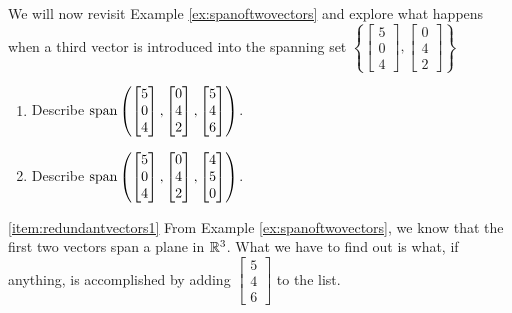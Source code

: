 \documentclass{ximera}
\begin{document}
\begin{example}\label{ex:redundantvectors}
We will now revisit Example \ref{ex:spanoftwovectors} and explore what happens when a third vector is introduced into the spanning set $\left\{\begin{bmatrix}5\\0\\4\end{bmatrix}, \begin{bmatrix}0\\4\\2\end{bmatrix}\right\}$  

\begin{enumerate}
\item \label{item:redundantvectors1}
Describe $\textnormal{span}\left(\begin{bmatrix}5\\0\\4\end{bmatrix}, \begin{bmatrix}0\\4\\2\end{bmatrix},\begin{bmatrix}5\\4\\6\end{bmatrix}\right)$.
\item \label{item:redundantvectors2}
Describe $\textnormal{span}\left(\begin{bmatrix}5\\0\\4\end{bmatrix}, \begin{bmatrix}0\\4\\2\end{bmatrix},\begin{bmatrix}4\\5\\0\end{bmatrix}\right)$.
\end{enumerate}
\begin{explanation}
\ref{item:redundantvectors1} From Example \ref{ex:spanoftwovectors}, we know that the first two vectors span a plane in $\mathbb{R}^3$.  What we have to find out is what, if anything, is accomplished by adding $\begin{bmatrix}5\\4\\6\end{bmatrix}$ to the list.  


\end{explanation}
\end{example}
\end{document}
